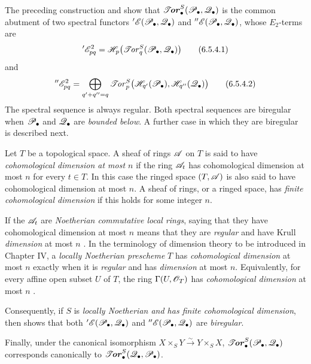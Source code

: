\begin{env}[6.5.4]
\label{III.6.5.4}
The preceding construction and  show that
$\boldsymbol{\mathscr{T}\!\mathit{or}}_\bullet^S(\mathscr{P}_\bullet,\mathscr{Q}_\bullet)$ is the common abutment
of two spectral functors
$'\mathscr{E}(\mathscr{P}_\bullet,\mathscr{Q}_\bullet)$ and
$''\mathscr{E}(\mathscr{P}_\bullet,\mathscr{Q}_\bullet)$, whose $E_2$-terms are
\[
  '\mathscr{E}_{pq}^2
  =
  \mathscr{H}_p\bigl(\mathscr{T}\!\mathit{or}_q^S(\mathscr{P}_\bullet,\mathscr{Q}_\bullet)\bigr)
  \tag{6.5.4.1}\label{III.6.5.4.1}
\]
and
\[
  ''\mathscr{E}_{pq}^2
  =
  \bigoplus_{q'+q''=q}
  \mathscr{T}\!\mathit{or}_p^S
  \bigl(\mathscr{H}_{q'}(\mathscr{P}_\bullet),
        \mathscr{H}_{q''}(\mathscr{Q}_\bullet)\bigr)
  \tag{6.5.4.2}\label{III.6.5.4.2}
\]
The spectral sequence  is always regular.  Both
spectral sequences are biregular when $\mathscr{P}_\bullet$ and
$\mathscr{Q}_\bullet$ are \emph{bounded below}.  A further case in which they
are biregular is described next.
\end{env}

\begin{env}[6.5.5]
\label{III.6.5.5}
Let $T$ be a topological space.  A sheaf of rings $\mathscr{A}$ on $T$
is said to have \emph{cohomological dimension at most $n$} if the
ring $\mathscr{A}_t$ has cohomological dimension at most $n$ for every
$t\in T$.  In this case the ringed space $(T,\mathscr{A})$ is also said
to have cohomological dimension at most $n$.  A sheaf of rings, or
a ringed space, has \emph{finite cohomological dimension} if this
holds for some integer $n$.

If the $\mathscr{A}_t$ are \emph{Noetherian commutative local rings}, saying
that they have cohomological dimension at most $n$ means that
they are \emph{regular} and have Krull \emph{dimension} at most $n$
.  In the terminology of dimension theory to
be introduced in Chapter IV, a \emph{locally Noetherian prescheme} $T$ has
\emph{cohomological dimension} at most $n$ exactly when it is \emph{regular}
 and has \emph{dimension} at most $n$.  Equivalently,
for every affine open subset $U$ of $T$, the ring
$\Gamma(U,\mathscr{O}_T)$ has \emph{cohomological dimension} at most $n$
.

Consequently, if $S$ is \emph{locally Noetherian and has finite
cohomological dimension}, then  shows that both
$'\mathscr{E}(\mathscr{P}_\bullet,\mathscr{Q}_\bullet)$ and
$''\mathscr{E}(\mathscr{P}_\bullet,\mathscr{Q}_\bullet)$ are \emph{biregular}.

Finally, under the canonical isomorphism
$X\times_SY\xrightarrow{\sim}Y\times_SX$,
$\boldsymbol{\mathscr{T}\!\mathit{or}}_\bullet^S(\mathscr{P}_\bullet,\mathscr{Q}_\bullet)$ corresponds
canonically to
$\boldsymbol{\mathscr{T}\!\mathit{or}}_\bullet^S(\mathscr{Q}_\bullet,\mathscr{P}_\bullet)$.
\end{env}


